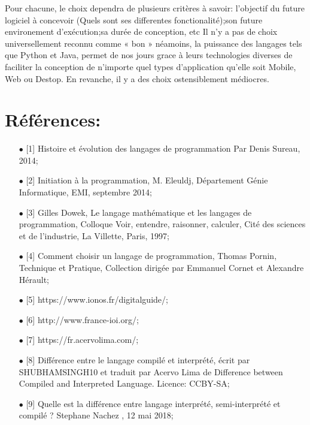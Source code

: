 \documentclass[a4paper,12pt]{article} %
\begin{document}
Pour chacune, le choix dependra de plusieurs critères à savoir: l'objectif du future logiciel à concevoir (Quels sont ses differentes fonctionalité);son future environement d'exécution;sa durée de conception, etc
Il n’y a pas de choix universellement reconnu comme « bon » néamoins, la puissance des langages tels que Python et Java, permet de nos jours grace à leurs technologies diverses de faciliter la conception de n'importe quel types d'application qu'elle soit Mobile, Web ou Destop. En revanche, il y a des choix ostensiblement médiocres.

\section{Références:}
\begin{itemize}
    \item[$\bullet$] [1] Histoire et évolution des langages de programmation Par Denis Sureau, 2014; 
    
    \item[$\bullet$] [2] Initiation à la programmation, M. Eleuldj, Département Génie Informatique, EMI, septembre 2014;
    
    \item[$\bullet$] [3] Gilles Dowek, Le langage mathématique et les langages de programmation, Colloque Voir, entendre, raisonner, calculer, Cité des sciences et de l'industrie, La Villette, Paris, 1997;
    
    \item[$\bullet$] [4] Comment choisir un langage de programmation, Thomas Pornin, Technique et Pratique, Collection dirigée par Emmanuel Cornet et Alexandre Hérault;
    
    \item[$\bullet$] [5] https://www.ionos.fr/digitalguide/;
    
    \item[$\bullet$] [6] http://www.france-ioi.org/;
    
    \item[$\bullet$] [7] https://fr.acervolima.com/;
    
    \item[$\bullet$] [8] Différence entre le langage compilé et interprété, écrit par SHUBHAMSINGH10 et traduit par Acervo Lima de Difference between Compiled and Interpreted Language. Licence: CCBY-SA;

    \item[$\bullet$] [9] Quelle est la différence entre langage interprété, semi-interprété et compilé ? Stephane Nachez , 12 mai 2018;
    

\end{itemize}
\end{document}
